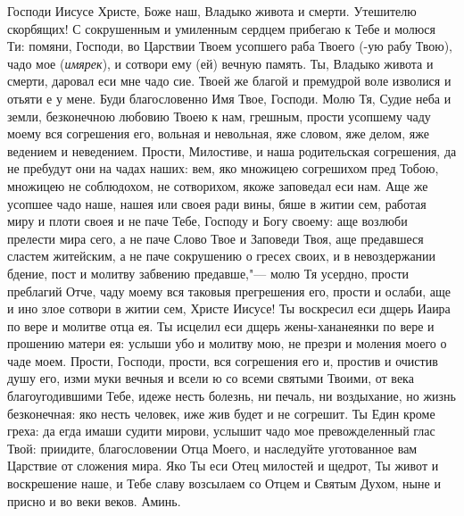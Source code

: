 \begin{mymulticols}
 


Господи Иисусе Христе, Боже наш, Владыко живота и смерти. Утешителю скорбящих! С сокрушенным и умиленным сердцем прибегаю к Тебе и молюся Ти: помяни, Господи, во Царствии Твоем усопшего раба Твоего (-ую рабу Твою), чадо мое ({\itshape имярек}), и сотвори ему (ей) вечную память. Ты, Владыко живота и смерти, даровал еси мне чадо сие. Твоей же благой и премудрой воле изволися и отьяти е у мене. Буди благословенно Имя Твое, Господи. Молю Тя, Судие неба и земли, безконечною любовию Твоею к нам, грешным, прости усопшему чаду моему вся согрешения его, вольная и невольная, яже словом, яже делом, яже ведением и неведением. Прости, Милостиве, и наша родительская согрешения, да не пребудут они на чадах наших: вем, яко множицею согрешихом пред Тобою, множицею не соблюдохом, не сотворихом, якоже заповедал еси нам. Аще же усопшее чадо наше, нашея или своея ради вины, бяше в житии сем, работая миру и плоти своея и не паче Тебе, Господу и Богу своему: аще возлюби прелести мира сего, а не паче Слово Твое и Заповеди Твоя, аще предавшеся сластем житейским, а не паче сокрушению о гресех своих, и в невоздержании бдение, пост и молитву забвению предавше,"--- молю Тя усердно, прости преблагий Отче, чаду моему вся таковыя прегрешения его, прости и ослаби, аще и ино злое сотвори в житии сем, Христе Иисусе! Ты воскресил еси дщерь Иаира по вере и молитве отца ея. Ты исцелил еси дщерь жены-хананеянки по вере и прошению матери ея: услыши убо и молитву мою, не презри и моления моего о чаде моем. Прости, Господи, прости, вся согрешения его и, простив и очистив душу его, изми муки вечныя и всели ю со всеми святыми Твоими, от века благоугодившими Тебе, идеже несть болезнь, ни печаль, ни воздыхание, но жизнь безконечная: яко несть человек, иже жив будет и не согрешит. Ты Един кроме греха: да егда имаши судити мирови, услышит чадо мое превожделенный глас Твой: приидите, благословении Отца Моего, и наследуйте уготованное вам Царствие от сложения мира. Яко Ты еси Отец милостей и щедрот, Ты живот и воскрешение наше, и Тебе славу возсылаем со Отцем и Святым Духом, ныне и присно и во веки веков. Аминь. 




\end{mymulticols}

\mychapterending


